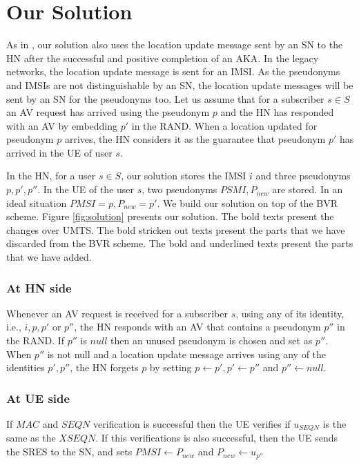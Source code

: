 \documentclass{llncs} %
\begin{document}
\section{Our Solution}
As in \cite{wisec17}, our solution also uses the location update message sent by an SN to the HN after the successful and positive completion of an AKA. In the legacy networks, the location update message is sent for an IMSI. As the pseudonyms and IMSIs are not distinguishable by an SN, the location update messages will be sent by an SN for the pseudonyms too. Let us assume that for a subscriber $s \in S$ an AV request has arrived using the pseudonym $p$ and the HN has responded with an AV by embedding $p'$ in the RAND. When a location updated for pseudonym $p$ arrives, the HN considers it as the guarantee that pseudonym $p'$ has arrived in the UE of user $s$.

In the HN, for a user $s \in S$, our solution stores the IMSI $i$ and three pseudonyms $p,p',p''$. In the UE of the user $s$, two pseudonyms $PSMI,P_{new}$ are stored. In an ideal situation $PMSI = p, P_{new} = p'$. We build our solution on top of the BVR scheme. Figure \ref{fig:solution} presents our solution. The bold texts present the changes over UMTS. The bold stricken out texts present the parts that we have discarded from the BVR scheme. The bold and underlined texts present the parts that we have added. 


\subsubsection{At HN side}
Whenever an AV request is received for a subscriber $s$, using any of its identity, i.e., $i,p,p'$ or $p''$, the HN responds with an AV that contains a pseudonym $p''$ in the RAND. If $p''$ is $null$ then an unused pseudonym is chosen and set as $p''$. When $p''$ is not null and a location update message arrives using any of the identities $p',p''$, the HN forgets $p$ by setting $p \leftarrow p', p' \leftarrow p''$ and $p'' \leftarrow null$. 


\subsubsection{At UE side}
If $MAC$ and $SEQN$ verification is successful then the UE verifies if $u_{SEQN}$ is the same as the $XSEQN$. If this verifications is also successful, then the UE sends the SRES to the SN, and sets $PMSI \leftarrow P_{new}$ and $P_{new} \leftarrow u_{p''}$
\end{document}
